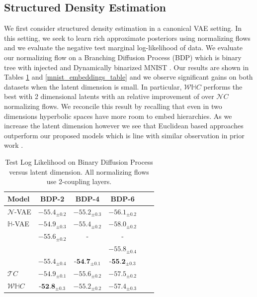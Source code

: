 \subsection{Structured Density Estimation}
We first consider structured density estimation in a canonical VAE setting. In this setting, we seek to learn rich approximate posteriors using normalizing flows and we evaluate the negative test marginal log-likelihood of data. We evaluate our normalizing flow on a Branching Diffusion Process (BDP) \cite{mathieu2019continuous} which is binary tree with injected and Dynamically binarized MNIST \cite{skopek2019mixed}. Our results are shown in Tables \ref{bdp_embeddings_table} and \ref{mnist_embeddings_table} and we observe significant gains on both datasets when the latent dimension is small. In particular, $\mathcal{W}\mathbb{H}C$ performs the best with 2 dimensional latents with an relative improvement of  over $\mathcal{N}C$ normalizing flows. We reconcile this result by recalling that even in two dimensions hyperbolic spaces have more room to embed hierarchies. As we increase the latent dimension however we see that Euclidean based approaches outperform our proposed models which is line with similar observation in prior work \cite{nickel2017poincare}.
\begin{table}[ht]
\label{bdp_embeddings_table}
\begin{small}
\begin{center}
\begin{tabular}{lccccr}
    \toprule
    Model   &  BDP-2 & BDP-4 & BDP-6\\
    \midrule
    $\mathcal{N}$-VAE & $-55.4_{\pm 0.2}$  & $-55.2_{\pm 0.3}$& $-56.1_{\pm 0.2}$   \\
    $\mathbb{H}$-VAE & $-54.9_{\pm 0.3}$& $-55.4_{\pm 0.2}$ &  $-58.0_{\pm 0.2}$\\
    \cut{$\mathcal{P}$-VAE$^*$ & $-55.6_{\pm 0.2}$ & - &-  \\}
    \cut{$\mathbb{U}$-VAE & &  & $-55.8_{\pm 0.4}$  \\}
    $\mathcal{N}C$ & $-55.4_{\pm 0.4}$ & $ \textbf{-54.7}_{\pm 0.1}$ & $\textbf{-55.2}_{\pm 0.3}$  \\
    $\mathcal{T}C$& $-54.9_{\pm 0.1}$& $-55.6_{\pm 0.2}$& $-57.5_{\pm0.2}$\\
    $\mathcal{W}\mathbb{H}C$& $\textbf{-52.8}_{\pm 0.3}$ & $-55.2_{\pm 0.2}$& $-57.4_{\pm 0.3}$\\
    \bottomrule
\end{tabular}
\caption{Test Log Likelihood on Binary Diffusion Process versus latent dimension. All normalizing flows use 2-coupling layers.}
\end{center}
\vskip -0.1in
\end{small}
\end{table}

